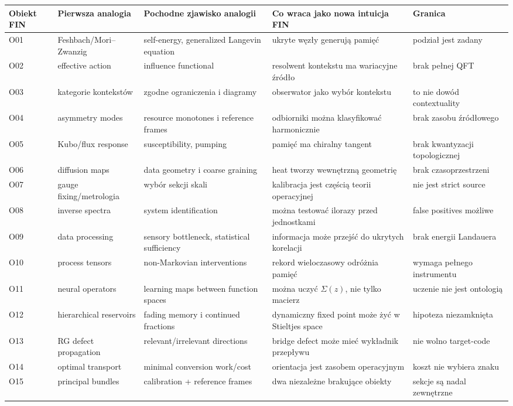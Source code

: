 \documentclass[11pt,a4paper,openany]{report}
\begin{document}
\begin{center}
\begingroup\fontsize{7}{8.4}\selectfont
\setlength{\tabcolsep}{2.5pt}
\renewcommand{\arraystretch}{1.16}
\begin{longtable}{@{}p{}p{}p{}p{}p{}@{}}
\toprule
\textbf{Obiekt FIN} & \textbf{Pierwsza analogia} & \textbf{Pochodne zjawisko analogii} & \textbf{Co wraca jako nowa intuicja FIN} & \textbf{Granica} \\
\midrule
\endhead
O01 & Feshbach/\allowbreak{}Mori--Zwanzig & self-energy, generalized Langevin equation & ukryte węzły generują pamięć & podział jest zadany \\
O02 & effective action & influence functional & resolwent kontekstu ma wariacyjne źródło & brak pełnej QFT \\
O03 & kategorie kontekstów & zgodne ograniczenia i diagramy & obserwator jako wybór kontekstu & to nie dowód contextuality \\
O04 & asymmetry modes & resource monotones i reference frames & odbiorniki mo\.zna klasyfikować harmonicznie & brak zasobu źródłowego \\
O05 & Kubo/\allowbreak{}flux response & susceptibility, pumping & pamięć ma chiralny tangent & brak kwantyzacji topologicznej \\
O06 & diffusion maps & data geometry i coarse graining & heat tworzy wewnętrzną geometrię & brak czasoprzestrzeni \\
O07 & gauge fixing/\allowbreak{}metrologia & wybór sekcji skali & kalibracja jest częścią teorii operacyjnej & nie jest strict source \\
O08 & inverse spectra & system identification & mo\.zna testować ilorazy przed jednostkami & false positives mo\.zliwe \\
O09 & data processing & sensory bottleneck, statistical sufficiency & informacja mo\.ze przejść do ukrytych korelacji & brak energii Landauera \\
O10 & process tensors & non-Markovian interventions & rekord wieloczasowy odró\.znia pamięć & wymaga pełnego instrumentu \\
O11 & neural operators & learning maps between function spaces & mo\.zna uczyć \(\Sigma(z)\), nie tylko macierz & uczenie nie jest ontologią \\
O12 & hierarchical reservoirs & fading memory i continued fractions & dynamiczny fixed point mo\.ze \.zyć w Stieltjes space & hipoteza niezamknięta \\
O13 & RG defect propagation & relevant/\allowbreak{}irrelevant directions & bridge defect mo\.ze mieć wykładnik przepływu & nie wolno target-code \\
O14 & optimal transport & minimal conversion work/\allowbreak{}cost & orientacja jest zasobem operacyjnym & koszt nie wybiera znaku \\
O15 & principal bundles & calibration + reference frames & dwa niezale\.zne brakujące obiekty & sekcje są nadal zewnętrzne \\
\bottomrule
\end{longtable}
\endgroup
\end{center}
\end{document}
